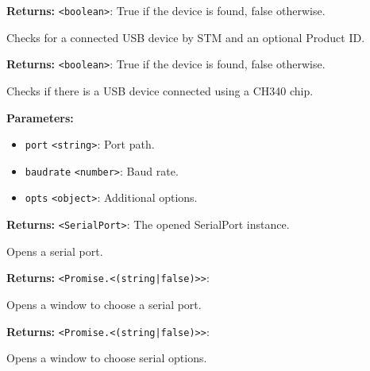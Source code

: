 \documentclass[12pt,a4paper]{article}
\begin{document}
\noindent \textbf{Returns:} \texttt{<boolean>}: True if the device is found, false otherwise.

\noindent Checks for a connected USB device by STM and an optional Product ID.

\vspace{5mm}
\noindent {}


\noindent \textbf{Returns:} \texttt{<boolean>}: True if the device is found, false otherwise.

\noindent Checks if there is a USB device connected using a CH340 chip.

\vspace{5mm}
\noindent {}


\noindent \textbf{Parameters:}
\begin{itemize}
  \item \texttt{port} \texttt{<string>}: Port path.
  \item \texttt{baudrate} \texttt{<number>}: Baud rate.
  \item \texttt{opts} \texttt{<object>}: Additional options.
\end{itemize}

\noindent \textbf{Returns:} \texttt{<SerialPort>}: The opened SerialPort instance.

\noindent Opens a serial port.

\vspace{5mm}
\noindent {}


\noindent \textbf{Returns:} \texttt{<Promise.<(string|false)>>}: 

\noindent Opens a window to choose a serial port.

\vspace{5mm}
\noindent {}


\noindent \textbf{Returns:} \texttt{<Promise.<(string|false)>>}: 

\noindent Opens a window to choose serial options.
\end{document}
